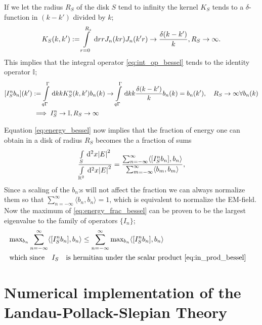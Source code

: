 \documentclass[11pt,a4paper, 
swedish,english %
]{article}
\begin{document}
If we let the radius $R_S$ of the disk $S$ tend to infinity the kernel $K_S$ tends to a $\delta$-function in $(k-k')$ divided by $k$;
\begin{equation*}
K_S(k,k')  := \int_{r=0}^{R_s} \id r r J_n(kr) J_n(k'r) \to \frac{\delta(k-k')}{k}, R_S \to \infty.
  \end{equation*}
This implies that the integral operator \ref{eq:int_op_bessel} tends to the identity operator $\mathbb{I}$;
\begin{equation*}
  \begin{aligned}
    [I_S^nb_n](k')&:=\int_{q\Gamma}^\Gamma \id k k K_S^n(k,k')b_n(k) \to \int_{q\Gamma}^\Gamma \id k k \frac{\delta(k-k')}{k}b_n(k)
    =b_n(k') \qc R_S \to \infty \forall b_n(k)\\
  &\implies I_S^n \to \mathbb{I}, R_S \to \infty
   \end{aligned}
\end{equation*}

Equation \eqref{eq:energy_bessel} now implies that the fraction of energy one can obtain in a disk of radius $R_S$ becomes the a fraction of sums
\begin{equation}
  \label{eq:energy_frac_bessel}
\frac{\int_S \id^2x \abs{E}^2}{\int_{\mathbb{R}^2} \id^2x \abs{E}^2}=\frac{\sum_{n=-\infty}^{\infty} \langle [I_S^nb_n],b_n \rangle}{\sum_{m=-\infty}^{\infty} \langle b_m,b_m \rangle},
\end{equation}
Since a scaling of the $b_n$:s will not affect the fraction we can
always normalize them so that $\sum_{n=-\infty}^{\infty} \langle b_n, b_n \rangle=1$, which is equivalent to normalize the EM-field.
Now the maximum of \eqref{eq:energy_frac_bessel} can be proven to be the largest eigenvalue to the family of operators $\{I_n\}$;
\begin{equation*}
  \begin{aligned}
   & \text{max}_{b_n} \sum_{n=-\infty}^{\infty} \langle [I_S^nb_n],b_n \rangle
    \leq \sum_{n=-\infty}^{\infty} \text{max}_{b_n}\langle [I_S^nb_n],b_n \rangle\\
&\qq*{which since} I_S \qq{is hermitian under the scalar product \ref{eq:in_prod_bessel}} 
  \end{aligned}
\end{equation*}




\section{Numerical implementation of the 
Landau-Pollack-Slepian Theory}
\newcommand{\varD}{\ensuremath{\mathcal{D}}}
\end{document}
